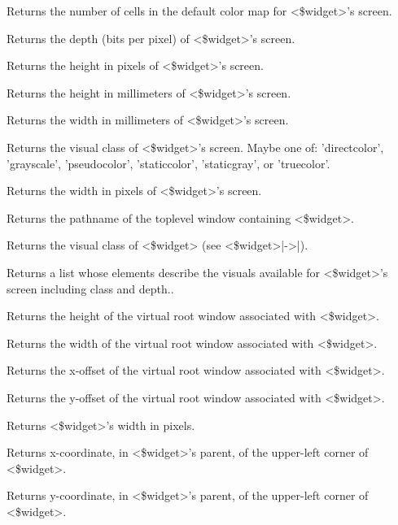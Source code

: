 \begin{enum}{1cm}
Returns the number of cells in the default color map for <\$widget>'s
screen.

Returns the depth (bits per pixel) of <\$widget>'s screen.

Returns the height in pixels of <\$widget>'s screen.

Returns the height in millimeters of <\$widget>'s screen.

Returns the width in millimeters of <\$widget>'s screen.

Returns the visual class of <\$widget>'s screen. Maybe one of: 'directcolor',
'grayscale', 'pseudocolor', 'staticcolor', 'staticgray', or 'truecolor'.

Returns the width in pixels of <\$widget>'s screen.

Returns the pathname of the toplevel window containing <\$widget>.

Returns the visual class of <\$widget> (see <\$widget>|->|).

Returns a list whose elements describe the visuals available for
<\$widget>'s screen including class and depth..

Returns the height of the virtual root window associated with <\$widget>.

Returns the width of the virtual root window associated with <\$widget>.

Returns the x-offset of the virtual root window associated with <\$widget>.

Returns the y-offset of the virtual root window associated with <\$widget>.

Returns <\$widget>'s width in  pixels.

Returns x-coordinate, in <\$widget>'s parent, of the upper-left corner of
<\$widget>.

Returns y-coordinate, in <\$widget>'s parent, of the upper-left corner of
<\$widget>.

\end{enum}

